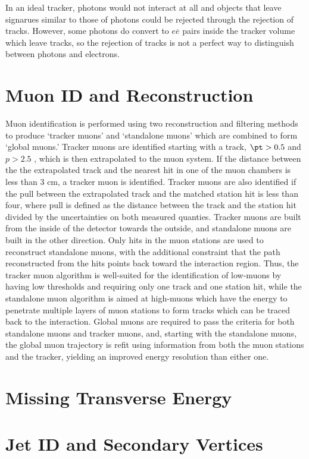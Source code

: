  In an ideal tracker, photons would not interact 
  at all and objects that leave signarues
  similar to those of photons could be rejected
  through the rejection of tracks.
 However, some photons do convert to $e\overline{e}$
  pairs inside the tracker volume which leave tracks,
  so the rejection of tracks is not a perfect way 
  to distinguish between photons and electrons.

\section{Muon ID and Reconstruction}

 Muon identification is performed using
  two reconstruction and filtering methods to produce 
  `tracker muons' and `standalone muons' which are 
  combined to form  `global muons.'
 Tracker muons are identified starting with
  a track, $\pt>0.5$ \GeV and $p>2.5$ \GeV,
  which is then extrapolated to the muon system.
 If the distance between the the extrapolated
  track and the nearest hit in one of the muon 
  chambers is less than 3 cm, a tracker muon
  is identified.
 Tracker muons are also identified if the 
  pull between the extrapolated track and the
  matched station hit is less than four, where
  pull is defined as the distance between
  the track and the station hit divided by 
  the uncertainties on both measured quanties.
 Tracker muons are built from the inside of the
  detector towards the outside, and 
  standalone muons are built in the other direction.
 Only hits in the muon stations are used to 
  reconstruct standalone muons, with the 
  additional constraint that the path reconstructed
  from the hits points back toward the 
  interaction region.
 Thus, the tracker muon algorithm is well-suited
  for the identification of low-\pt muons by having
  low thresholds and requiring only one track
  and one station hit, while the standalone
  muon algorithm is aimed at high-\pt muons
  which have the energy to penetrate multiple layers
  of muon stations to form tracks which can be
  traced back to the interaction.
 Global muons are required to pass the criteria for both 
  standalone muons and tracker muons, and,
  starting with the standalone muons, 
  the global muon trajectory is refit using information from both 
  the muon stations and the tracker,
  yielding an improved energy resolution than either one.




\section{Missing Transverse Energy}

\section{Jet ID and Secondary Vertices}

